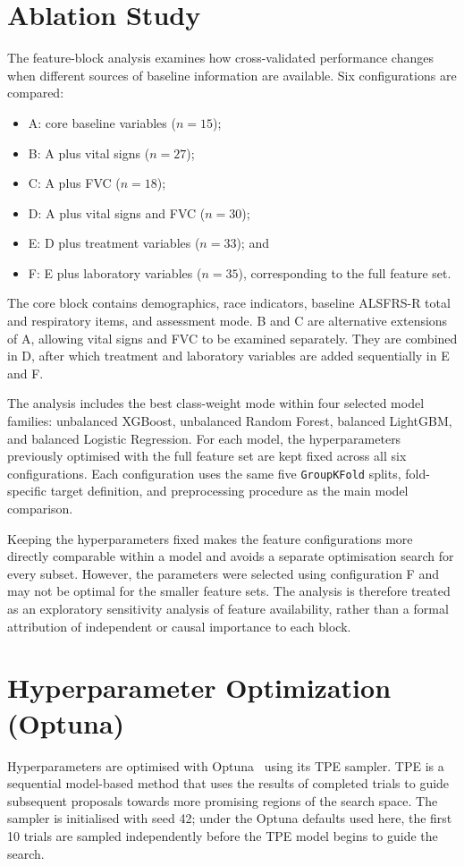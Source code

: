 \section{Ablation Study}
\label{sec:methods_ablation}
The feature-block analysis examines how cross-validated performance changes when different sources of baseline information are available. Six configurations are compared:
\begin{itemize}
  \item A: core baseline variables ($n\!=\!15$);
  \item B: A plus vital signs ($n\!=\!27$);
  \item C: A plus \gls{FVC} ($n\!=\!18$);
  \item D: A plus vital signs and \gls{FVC} ($n\!=\!30$);
  \item E: D plus treatment variables ($n\!=\!33$); and
  \item F: E plus laboratory variables ($n\!=\!35$), corresponding to the full feature set.
\end{itemize}
The core block contains demographics, race indicators, baseline \gls{ALSFRS-R} total and respiratory items, and assessment mode. B and C are alternative extensions of A, allowing vital signs and FVC to be examined separately. They are combined in D, after which treatment and laboratory variables are added sequentially in E and F.

The analysis includes the best class-weight mode within four selected model families: unbalanced XGBoost, unbalanced Random Forest, balanced LightGBM, and balanced Logistic Regression. For each model, the hyperparameters previously optimised with the full feature set are kept fixed across all six configurations. Each configuration uses the same five \texttt{GroupKFold} splits, fold-specific target definition, and preprocessing procedure as the main model comparison.

Keeping the hyperparameters fixed makes the feature configurations more directly comparable within a model and avoids a separate optimisation search for every subset. However, the parameters were selected using configuration F and may not be optimal for the smaller feature sets. The analysis is therefore treated as an exploratory sensitivity analysis of feature availability, rather than a formal attribution of independent or causal importance to each block.

\section{Hyperparameter Optimization (Optuna)}
\label{sec:methods_optuna}
Hyperparameters are optimised with Optuna~\cite{optuna2019} using its \gls{TPE} sampler. TPE is a sequential model-based method that uses the results of completed trials to guide subsequent proposals towards more promising regions of the search space. The sampler is initialised with seed 42; under the Optuna defaults used here, the first 10 trials are sampled independently before the TPE model begins to guide the search.

